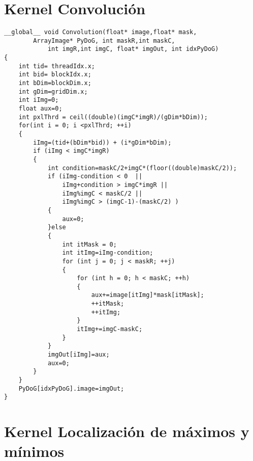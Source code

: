 
\chapter{Kernel Convolución}
\singlespacing
\begin{small}

\lstset{tabsize=2, frame=none}
\begin{lstlisting}
__global__ void Convolution(float* image,float* mask, 
		ArrayImage* PyDoG, int maskR,int maskC,
	        int imgR,int imgC, float* imgOut, int idxPyDoG)
{
	int tid= threadIdx.x;
	int bid= blockIdx.x;
	int bDim=blockDim.x;
	int gDim=gridDim.x;
	int iImg=0;
	float aux=0;
	int pxlThrd = ceil((double)(imgC*imgR)/(gDim*bDim)); 
	for(int i = 0; i <pxlThrd; ++i)
	{
		iImg=(tid+(bDim*bid)) + (i*gDim*bDim);
		if (iImg < imgC*imgR)
		{
			int condition=maskC/2+imgC*(floor((double)maskC/2));
			if (iImg-condition < 0  ||										
				iImg+condition > imgC*imgR ||								
				iImg%imgC < maskC/2 ||										
				iImg%imgC > (imgC-1)-(maskC/2) )							
			{
				aux=0;
			}else
			{		
				int itMask = 0;
				int itImg=iImg-condition;
				for (int j = 0; j < maskR; ++j)
				{		
					for (int h = 0; h < maskC; ++h)
					{
						aux+=image[itImg]*mask[itMask];
						++itMask;
						++itImg;
					}
					itImg+=imgC-maskC;
				}
			}
			imgOut[iImg]=aux;
			aux=0;
		}
	}
	PyDoG[idxPyDoG].image=imgOut;
}
\end{lstlisting}

\end{small}
\pagebreak

\chapter{Kernel Localización de máximos y mínimos }


